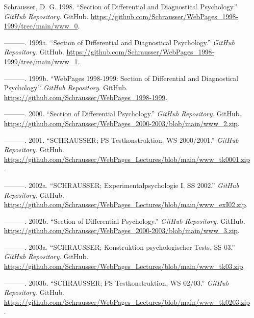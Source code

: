 \documentclass[
]{article}
\author{Dietmar Gerald SCHRAUSSER}
\date{14.04.2026}
\newlength{\cslhangindent}
\newlength{\cslentryspacingunit} %
\newenvironment{CSLReferences}[2] %
 {%
  \setlength{\parindent}{0pt}
  \ifodd #1
  \let\oldpar\par
  \def\par{\hangindent=\cslhangindent\oldpar}
  \fi
  \setlength{\parskip}{#2\cslentryspacingunit}
 }%
 {}
\begin{document}
\hypertarget{refs}{}
\begin{CSLReferences}{1}{0}
\leavevmode{}%
Schrausser, D. G. 1998. {``{Section of Differential and Diagnostical
Psychology}.''} \emph{GitHub Repository}. GitHub.
\url{https://github.com/Schrausser/WebPages_1998-1999/tree/main/www_0}.

\leavevmode{}%
---------. 1999a. {``{Section of Differential and Diagnostical
Psychology}.''} \emph{GitHub Repository}. GitHub.
\url{https://github.com/Schrausser/WebPages_1998-1999/tree/main/www_1}.

\leavevmode{}%
---------. 1999b. {``{WebPages 1998-1999: Section of Differential and
Diagnostical Psychology}.''} \emph{GitHub Repository}. GitHub.
\url{https://github.com/Schrausser/WebPages_1998-1999}.

\leavevmode{}%
---------. 2000. {``{Section of Differential Psychology}.''}
\emph{GitHub Repository}. GitHub.
\url{https://github.com/Schrausser/WebPages_2000-2003/blob/main/www_2.zip}.

\leavevmode{}%
---------. 2001. {``{SCHRAUSSER; PS Testkonstruktion, WS 2000/2001}.''}
\emph{GitHub Repository}. GitHub.
\url{https://github.com/Schrausser/WebPages_Lectures/blob/main/www_tk0001.zip}.

\leavevmode{}%
---------. 2002a. {``{SCHRAUSSER; Experimentalpsychologie I, SS
2002}.''} \emph{GitHub Repository}. GitHub.
\url{https://github.com/Schrausser/WebPages_Lectures/blob/main/www_exI02.zip}.

\leavevmode{}%
---------. 2002b. {``{Section of Differential Psychology}.''}
\emph{GitHub Repository}. GitHub.
\url{https://github.com/Schrausser/WebPages_2000-2003/blob/main/www_3.zip}.

\leavevmode{}%
---------. 2003a. {``{SCHRAUSSER; Konstruktion psychologischer Tests, SS
03}.''} \emph{GitHub Repository}. GitHub.
\url{https://github.com/Schrausser/WebPages_Lectures/blob/main/www_tk03.zip}.

\leavevmode{}%
---------. 2003b. {``{SCHRAUSSER; PS Testkonstruktion, WS 02/03}.''}
\emph{GitHub Repository}. GitHub.
\url{https://github.com/Schrausser/WebPages_Lectures/blob/main/www_tk0203.zip}.


\end{CSLReferences}
\end{document}
